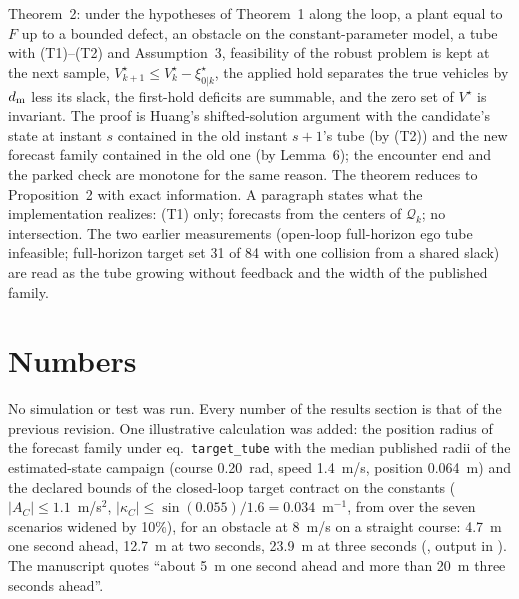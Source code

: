 \documentclass[11pt]{article}
\begin{document}
Theorem~2: under the hypotheses of Theorem~1 along the loop, a plant equal to
$F$ up to a bounded defect, an obstacle on the constant-parameter model, a
tube with (T1)--(T2) and Assumption~3, feasibility of the robust problem is
kept at the next sample, $V^\star_{k+1}\le V^\star_k-\xi^\star_{0|k}$, the
applied hold separates the true vehicles by $d_{\rm m}$ less its slack, the
first-hold deficits are summable, and the zero set of $V^\star$ is invariant.
The proof is Huang's shifted-solution argument with the candidate's state at
instant $s$ contained in the old instant $s+1$'s tube (by (T2)) and the new
forecast family contained in the old one (by Lemma~6); the encounter end and
the parked check are monotone for the same reason. The theorem reduces to
Proposition~2 with exact information. A paragraph states what the
implementation realizes: (T1) only; forecasts from the centers of
$\mathcal Q_k$; no intersection. The two earlier measurements (open-loop
full-horizon ego tube infeasible; full-horizon target set 31 of 84 with one
collision from a shared slack) are read as the tube growing without feedback
and the width of the published family.

\section{Numbers}
No simulation or test was run. Every number of the results section is that of
the previous revision. One illustrative calculation was added: the position
radius of the forecast family under eq.\ \texttt{target\_tube} with the median
published radii of the estimated-state campaign (course 0.20~rad, speed
1.4~m/s, position 0.064~m) and the declared bounds of the closed-loop target
contract on the constants ($|A_C|\le1.1$~m/s$^2$, $|\kappa_C|\le\sin(0.055)/1.6
=0.034$~m$^{-1}$, from  over the seven
scenarios widened by 10\%), for an obstacle at 8~m/s on a straight course:
4.7~m one second ahead, 12.7~m at two seconds, 23.9~m at three seconds
(, output in
). The manuscript quotes ``about 5~m one second
ahead and more than 20~m three seconds ahead''.
\end{document}
